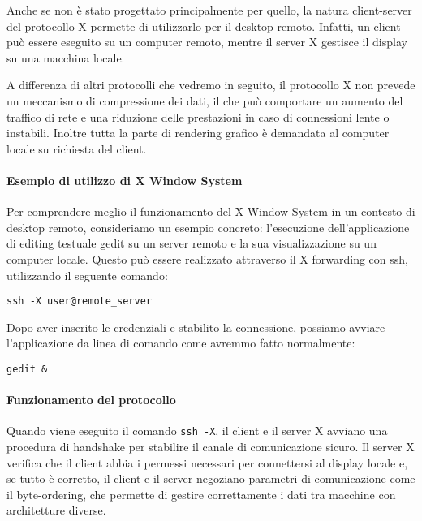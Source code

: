 \documentclass[12pt,a4paper,openright,twoside]{book}
\begin{document}
Anche se non è stato progettato principalmente per quello, la natura client-server del protocollo X permette di utilizzarlo per il desktop remoto. Infatti, un client può essere eseguito su un computer remoto, mentre il server X gestisce il display su una macchina locale.

A differenza di altri protocolli che vedremo in seguito, il protocollo X non prevede un meccanismo di compressione dei dati, il che può comportare un aumento del traffico di rete e una riduzione delle prestazioni in caso di connessioni lente o instabili. Inoltre tutta la parte di rendering grafico è demandata al computer locale su richiesta del client.

\paragraph{Esempio di utilizzo di X Window System}

Per comprendere meglio il funzionamento del X Window System in un contesto di desktop remoto, consideriamo un esempio concreto: l'esecuzione dell'applicazione di editing testuale gedit su un server remoto e la sua visualizzazione su un computer locale. Questo può essere realizzato attraverso il X forwarding con ssh, utilizzando il seguente comando:

\begin{verbatim}
ssh -X user@remote_server
\end{verbatim}

Dopo aver inserito le credenziali e stabilito la connessione, possiamo avviare l'applicazione da linea di comando come avremmo fatto normalmente:

\begin{verbatim}
gedit &
\end{verbatim}

\paragraph{Funzionamento del protocollo}

Quando viene eseguito il comando \texttt{ssh -X}, il client e il server X avviano una procedura di handshake per stabilire il canale di comunicazione sicuro. Il server X verifica che il client abbia i permessi necessari per connettersi al display locale e, se tutto è corretto, il client e il server negoziano parametri di comunicazione come il byte-ordering, che permette di gestire correttamente i dati tra macchine con architetture diverse.
\end{document}
